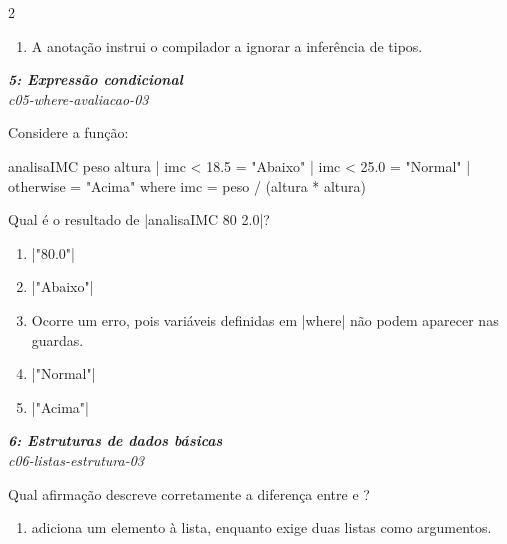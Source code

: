 \documentclass[a4paper,10pt,brazil]{article}
\begin{document}
\begin{multicols}{2}
\begin{enumerate}
  \item A anotação  instrui o compilador a ignorar a inferência de tipos.


\end{enumerate}

\begin{flushright}
  \footnotesize
  \textit{\textbf{5: Expressão condicional}}\\
  \textit{c05-where-avaliacao-03}\\

\end{flushright}
Considere a função:
\begin{haskellcode}
analisaIMC peso altura
  | imc < 18.5 = "Abaixo"
  | imc < 25.0 = "Normal"
  | otherwise  = "Acima"
  where
    imc = peso / (altura * altura)
\end{haskellcode}
Qual é o resultado de \haskellinline|analisaIMC 80 2.0|?

\begin{enumerate}
  \item \haskellinline|"80.0"|

  \item \haskellinline|"Abaixo"|

  \item Ocorre um erro, pois variáveis definidas em \haskellinline|where| não podem aparecer nas guardas.

  \item \haskellinline|"Normal"|

  \item \haskellinline|"Acima"|


\end{enumerate}

\begin{flushright}
  \footnotesize
  \textit{\textbf{6: Estruturas de dados básicas}}\\
  \textit{c06-listas-estrutura-03}\\

\end{flushright}
Qual afirmação descreve corretamente a diferença entre \haskellinline{(:)} e \haskellinline{(++)}?

\begin{enumerate}
  \item \haskellinline{(++)} adiciona um elemento à lista, enquanto \haskellinline{(:)} exige duas listas como argumentos.


\end{enumerate}
\end{multicols}
\end{document}
